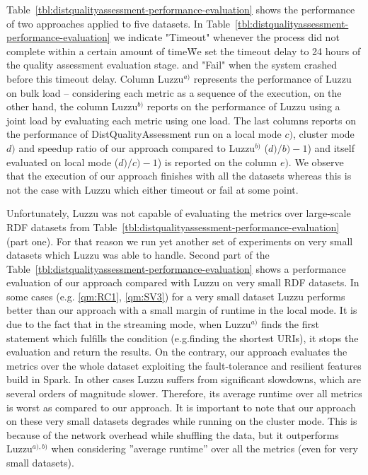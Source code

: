 Table~\ref{tbl:distqualityassessment-performance-evaluation} shows the performance of two approaches applied to five datasets.
In Table~\ref{tbl:distqualityassessment-performance-evaluation} we indicate "Timeout" whenever the process did not complete within a certain amount of time\f{We set the timeout delay to 24 hours of the quality assessment evaluation stage.} and "Fail" when the system crashed before this timeout delay.
Column Luzzu$^{a)}$ represents the performance of Luzzu on bulk load -- considering each metric as a sequence of the execution, on the other hand, the column Luzzu$^{b)}$ reports on the performance of Luzzu using a joint load by evaluating each metric using one load.
The last columns reports on the performance of DistQualityAssessment run on a local mode $c)$, cluster mode $d)$ and speedup ratio of our approach compared to Luzzu$^{b)}$ ($d)/b)-1$) and itself evaluated on local mode ($d)/c)-1$) is reported on the column $e)$.
We observe that the execution of our approach finishes with all the datasets whereas this is not the case with Luzzu which either timeout or fail at some point.

Unfortunately, Luzzu was not capable of evaluating the metrics over large-scale \gls{RDF} datasets from Table~\ref{tbl:distqualityassessment-performance-evaluation} (part one). 
For that reason we run yet another set of experiments on very small datasets which Luzzu was able to handle. 
Second part of the Table~\ref{tbl:distqualityassessment-performance-evaluation} shows a performance evaluation of our approach compared with Luzzu on very small \gls{RDF} datasets.
In some cases (e.g. \ref{qm:RC1}, \ref{qm:SV3}) for a very small dataset Luzzu performs better than our approach with a small margin of runtime in the local mode.
It is due to the fact that in the streaming mode, when Luzzu$^{a)}$ finds the first statement which fulfills the condition (e.g.finding the shortest \gls{URI}s), it stops the evaluation and return the results.
On the contrary, our approach evaluates the metrics over the whole dataset exploiting the fault-tolerance and resilient features build in Spark.
In other cases Luzzu suffers from significant slowdowns, which are several orders of magnitude slower.
Therefore, its average runtime over all metrics is worst as compared to our approach. 
It is important to note that our approach on these very small datasets degrades while running on the cluster mode.
This is because of the network overhead while shuffling the data, but it outperforms Luzzu$^{a),b)}$ when considering ''average runtime'' over all the metrics (even for very small datasets).


